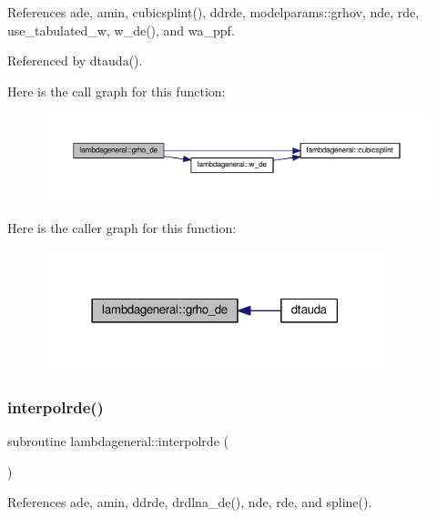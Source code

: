 References ade, amin, cubicsplint(), ddrde, modelparams\+::grhov, nde, rde, use\+\_\+tabulated\+\_\+w, w\+\_\+de(), and wa\+\_\+ppf.



Referenced by dtauda().

Here is the call graph for this function\+:
\nopagebreak
\begin{figure}[H]
\begin{center}
\leavevmode
\includegraphics[width=350pt]{namespacelambdageneral_a07db6feea7db4bda2dd9465dafa7895f_cgraph}
\end{center}
\end{figure}
Here is the caller graph for this function\+:
\nopagebreak
\begin{figure}[H]
\begin{center}
\leavevmode
\includegraphics[width=282pt]{namespacelambdageneral_a07db6feea7db4bda2dd9465dafa7895f_icgraph}
\end{center}
\end{figure}
\mbox{\label{namespacelambdageneral_ac5a1ca91bd76eaf1d2f8e05944b798d6}} 
\subsubsection{\texorpdfstring{interpolrde()}{interpolrde()}}
{\footnotesize\ttfamily subroutine lambdageneral\+::interpolrde (\begin{DoxyParamCaption}{ }\end{DoxyParamCaption})}



References ade, amin, ddrde, drdlna\+\_\+de(), nde, rde, and spline().

